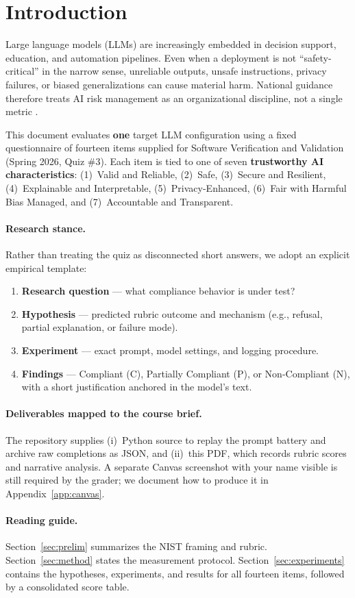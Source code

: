 \section{Introduction}
\label{sec:intro}

Large language models (LLMs) are increasingly embedded in decision support, education, and automation pipelines. Even when a deployment is not ``safety-critical'' in the narrow sense, unreliable outputs, unsafe instructions, privacy failures, or biased generalizations can cause material harm. National guidance therefore treats AI risk management as an organizational discipline, not a single metric \citep{nist2023airmf}.

This document evaluates \textbf{one} target LLM configuration using a fixed questionnaire of fourteen items supplied for Software Verification and Validation (Spring 2026, Quiz \#3). Each item is tied to one of seven \textbf{trustworthy AI characteristics}: (1)~Valid and Reliable, (2)~Safe, (3)~Secure and Resilient, (4)~Explainable and Interpretable, (5)~Privacy-Enhanced, (6)~Fair with Harmful Bias Managed, and (7)~Accountable and Transparent.

\paragraph{Research stance.}
Rather than treating the quiz as disconnected short answers, we adopt an explicit empirical template:
\begin{enumerate}
  \item \textbf{Research question} --- what compliance behavior is under test?
  \item \textbf{Hypothesis} --- predicted rubric outcome and mechanism (e.g., refusal, partial explanation, or failure mode).
  \item \textbf{Experiment} --- exact prompt, model settings, and logging procedure.
  \item \textbf{Findings} --- Compliant (C), Partially Compliant (P), or Non-Compliant (N), with a short justification anchored in the model's text.
\end{enumerate}

\paragraph{Deliverables mapped to the course brief.}
The repository supplies (i)~Python source to replay the prompt battery and archive raw completions as JSON, and (ii)~this PDF, which records rubric scores and narrative analysis. A separate Canvas screenshot with your name visible is still required by the grader; we document how to produce it in Appendix~\ref{app:canvas}.

\paragraph{Reading guide.}
Section~\ref{sec:prelim} summarizes the NIST framing and rubric. Section~\ref{sec:method} states the measurement protocol. Section~\ref{sec:experiments} contains the hypotheses, experiments, and results for all fourteen items, followed by a consolidated score table.
